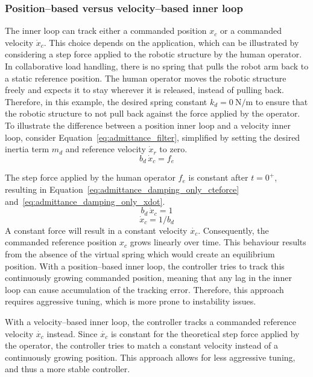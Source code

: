 \documentclass[11pt,a4paper,twoside,openright]{book}
\begin{document}
\subsubsection{Position--based versus velocity--based inner loop}
The inner loop can track either a commanded position $x_c$ or a commanded velocity $\dot{x}_c$. This choice depends on the application, which can be illustrated by considering a step force applied to the robotic structure by the human operator. In collaborative load handling, there is no spring that pulls the robot arm back to a static reference position. The human operator moves the robotic structure freely and expects it to stay wherever it is released, instead of pulling back. Therefore, in this example, the desired spring constant $k_d = \SI{0}{\newton\per\metre}$ to ensure that the robotic structure to not pull back against the force applied by the operator. To illustrate the difference between a position inner loop and a velocity inner loop, consider Equation~\eqref{eq:admittance_filter}, simplified by setting the desired inertia term $m_d$ and reference velocity $\dot{x}_r$ to zero. 
\begin{equation}
    b_{d}\,\dot{x}_{c} = f_{e}
    \label{eq:admittance_damping_only}
\end{equation}

The step force applied by the human operator $f_e$ is constant after $t = 0^{+}$, resulting in Equation~\eqref{eq:admittance_damping_only_cteforce} and~\eqref{eq:admittance_damping_only_xdot}.
\begin{equation}
    b_{d}\,\dot{x}_{c} = 1
    \label{eq:admittance_damping_only_cteforce}
\end{equation}
\begin{equation}
    \dot{x}_{c} = 1/b_{d}
    \label{eq:admittance_damping_only_xdot}
\end{equation}
A constant force will result in a constant velocity $\dot{x_c}$. Consequently, the commanded reference position $x_c$ grows linearly over time. This behaviour results from the absence of the virtual spring which would create an equilibrium position. With a position--based inner loop, the controller tries to track this continuously growing commanded position, meaning that any lag in the inner loop can cause accumulation of the tracking error. Therefore, this approach requires aggressive tuning, which is more prone to instability issues.

With a velocity--based inner loop, the controller tracks a commanded reference velocity $\dot{x_c}$ instead. Since $\dot{x_c}$ is constant for the theoretical step force applied by the operator, the controller tries to match a constant velocity instead of a continuously growing position. This approach allows for less aggressive tuning, and thus a more stable controller.
\end{document}
